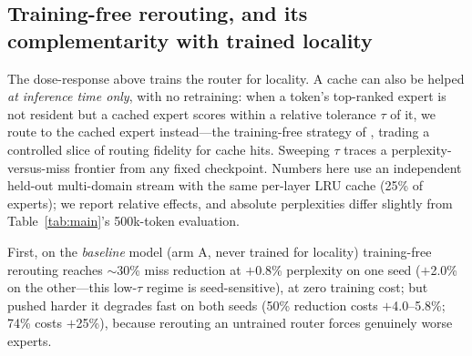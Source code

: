 \documentclass[11pt]{article}
\begin{document}
\subsection{Training-free rerouting, and its complementarity with trained locality}
\label{sec:complementarity}
The dose-response above trains the router for locality. A cache can also be
helped \emph{at inference time only}, with no retraining: when a token's
top-ranked expert is not resident but a cached expert scores within a relative
tolerance $\tau$ of it, we route to the cached expert instead---the training-free
strategy of \citet{cachecond2024}, trading a controlled slice of routing
fidelity for cache hits. Sweeping $\tau$ traces a perplexity-versus-miss frontier
from any fixed checkpoint. Numbers here use an independent held-out
multi-domain stream with the same per-layer LRU cache (25\% of experts); we
report relative effects, and absolute perplexities differ slightly from
Table~\ref{tab:main}'s 500k-token evaluation.

First, on the \emph{baseline} model (arm A, never trained for locality)
training-free rerouting reaches $\sim$30\% miss reduction at $+$0.8\% perplexity
on one seed ($+$2.0\% on the other---this low-$\tau$ regime is seed-sensitive),
at zero training cost; but pushed harder it degrades fast on both seeds (50\%
reduction costs $+$4.0--5.8\%; 74\% costs $+$25\%), because rerouting an
untrained router forces genuinely worse experts.
\end{document}

